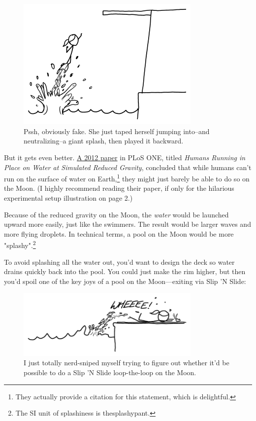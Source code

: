 {\begin{figure}[!htbp]
\centering
\includegraphics[scale=0.5, max width=0.8\textwidth]{imgs/a/124/dive.png}
\caption{Pssh, obviously fake. She just taped herself jumping into--and neutralizing--a giant splash, then played it backward.}
\end{figure}

{But it gets even better. \href{http://www.plosone.org/article/fetchObject.action?uri=info\%3Adoi\%2F10.1371\%2Fjournal.pone.0037300&representation=PDF}{A 2012 paper} in PLoS ONE, titled \emph{Humans Running in Place on Water at Simulated Reduced Gravity}, concluded that while humans can't run on the surface of water on Earth,{\footnote{They actually provide a citation for this statement, which is delightful.} } they might just barely be able to do so on the Moon. (I highly recommend reading their paper, if only for the hilarious experimental setup illustration on page 2.)}

{Because of the reduced gravity on the Moon, the \emph{water} would be launched upward more easily, just like the swimmers. The result would be larger waves and more flying droplets. In technical terms, a pool on the Moon would be more "splashy".{\footnote{The SI unit of splashiness is thesplashypant.} } }

{To avoid splashing all the water out, you'd want to design the deck so water drains quickly back into the pool. You could just make the rim higher, but then you'd spoil one of the key joys of a pool on the Moon—exiting via Slip 'N Slide:}

\begin{figure}[!htbp]
\centering
\includegraphics[scale=0.5, max width=0.8\textwidth]{imgs/a/124/slide.png}
\caption{I just totally nerd-sniped myself trying to figure out whether it'd be possible to do a Slip 'N Slide loop-the-loop on the Moon.}
\end{figure}

}
